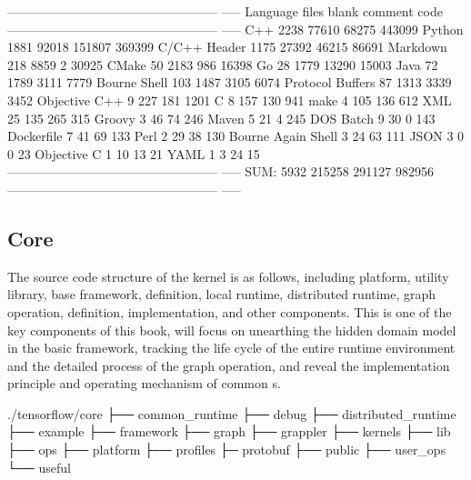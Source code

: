 \begin{content}
\begin{leftbar}
\begin{python}[caption={TensorFlowCode Stats}]
-------------------------------------------------- -----
Language             files    blank    comment    code
-------------------------------------------------- -----
C++                   2238    77610     68275    443099
Python                1881    92018    151807    369399
C/C++ Header          1175    27392     46215     86691
Markdown 218 8859 2 30925
CMake                   50     2183       986     16398
Go                      28     1779     13290     15003
Java                    72     1789      3111      7779
Bourne Shell           103     1487      3105      6074
Protocol Buffers        87     1313      3339      3452
Objective C++            9      227       181      1201
C                        8      157       130       941
make                     4      105       136       612
XML                     25      135       265       315
Groovy                   3       46        74       246
Maven                    5       21         4       245
DOS Batch 9 30 0 143
Dockerfile               7       41        69       133
Perl                     2       29        38       130
Bourne Again Shell       3       24        63       111
JSON                     3        0         0        23
Objective C              1       10        13        21
YAML 1 3 24 15
-------------------------------------------------- -----
SUM:                  5932   215258    291127    982956
-------------------------------------------------- -----
\end{python}
\end{leftbar}


\subsection{Core}
The source code structure of the kernel is as follows, including platform, utility library, base framework,  definition, local runtime, distributed runtime, graph operation,  definition,  implementation, and other components. This is one of the key components of this book, will focus on unearthing the hidden domain model in the basic framework, tracking the life cycle of the entire runtime environment and the detailed process of the graph operation, and reveal the  implementation principle and operating mechanism of common s.

\begin{leftbar}
\begin{c++}[caption={Core source structure}]
./tensorflow/core
├── common_runtime
├── debug
├── distributed_runtime
├── example
├── framework
├── graph
├── grappler
├── kernels
├── lib
├── ops
├── platform
├── profiles
├─ protobuf
├── public
├── user_ops
└── useful
\end{c++}
\end{leftbar}


\end{content}
